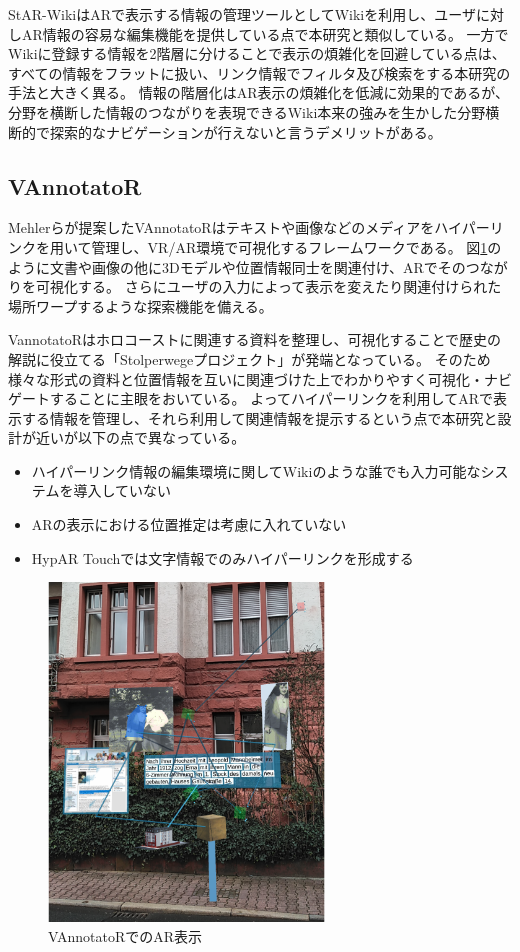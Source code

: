 StAR-WikiはARで表示する情報の管理ツールとしてWikiを利用し、ユーザに対しAR情報の容易な編集機能を提供している点で本研究と類似している。
一方でWikiに登録する情報を2階層に分けることで表示の煩雑化を回避している点は、すべての情報をフラットに扱い、リンク情報でフィルタ及び検索をする本研究の手法と大きく異る。
情報の階層化はAR表示の煩雑化を低減に効果的であるが、分野を横断した情報のつながりを表現できるWiki本来の強みを生かした分野横断的で探索的なナビゲーションが行えないと言うデメリットがある。

\subsection{VAnnotatoR}
Mehlerらが提案したVAnnotatoR\cite{10.1145/3209542.3209572}はテキストや画像などのメディアをハイパーリンクを用いて管理し、VR/AR環境で可視化するフレームワークである。
図\ref{fig:VAnnotatoR}のように文書や画像の他に3Dモデルや位置情報同士を関連付け、ARでそのつながりを可視化する。
さらにユーザの入力によって表示を変えたり関連付けられた場所ワープするような探索機能を備える。

VannotatoRはホロコーストに関連する資料を整理し、可視化することで歴史の解説に役立てる「Stolperwegeプロジェクト」が発端となっている。
そのため様々な形式の資料と位置情報を互いに関連づけた上でわかりやすく可視化・ナビゲートすることに主眼をおいている。
よってハイパーリンクを利用してARで表示する情報を管理し、それら利用して関連情報を提示するという点で本研究と設計が近いが以下の点で異なっている。
\begin{itemize} 
  \item ハイパーリンク情報の編集環境に関してWikiのような誰でも入力可能なシステムを導入していない
  \item ARの表示における位置推定は考慮に入れていない
  \item HypAR Touchでは文字情報でのみハイパーリンクを形成する
\end{itemize}

\begin{figure}[H]
  \centering 
  \includegraphics[height=90mm]{images/VAnnotatoR.png}
  \caption{VAnnotatoRでのAR表示} \label{fig:VAnnotatoR}
\end{figure}


